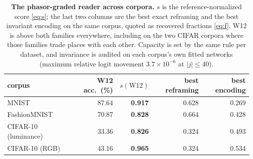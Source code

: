 \begin{table}[t]
\centering\small
\caption{\textbf{The phasor-graded reader across corpora.} $s$ is the reference-normalized score \eqref{eq:s}; the last two columns are the best exact reframing and the best invariant encoding on the same corpus, quoted as recovered fractions \eqref{eq:f}. W12 is above both families everywhere, including on the two CIFAR corpora where those families trade places with each other. Capacity is set by the same rule per dataset, and invariance is audited on each corpus's own fitted networks (maximum relative logit movement $3.7\times10^{-6}$ at $|j| \le 40$).}
\label{tab:w12cross}
\begin{tabular}{@{}lrrrr@{}}
\toprule
corpus & W12 acc.\ (\%) & $s(\mathrm{W12})$ & best reframing & best encoding \\
\midrule
MNIST & 87.64 & \textbf{0.917} & 0.628 & 0.269 \\
FashionMNIST & 70.87 & \textbf{0.828} & 0.664 & 0.428 \\
CIFAR-10 (luminance) & 33.36 & \textbf{0.826} & 0.324 & 0.493 \\
CIFAR-10 (RGB) & 43.16 & \textbf{0.965} & 0.324 & 0.534 \\
\bottomrule
\end{tabular}
\end{table}
